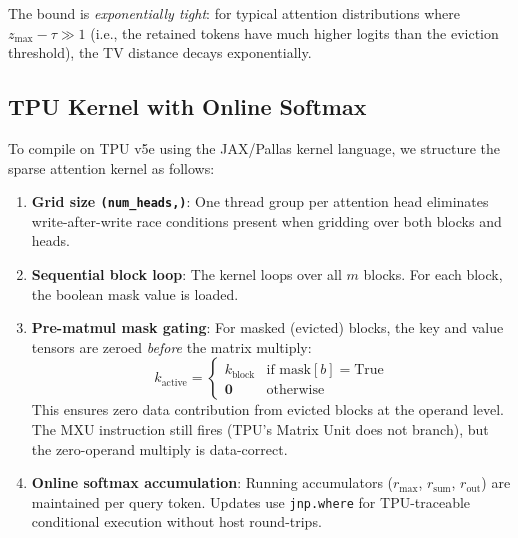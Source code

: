 \documentclass[conference,10pt]{IEEEtran}
\begin{document}
The bound is \emph{exponentially tight}: for typical attention distributions
where $z_{\max} - \tau \gg 1$ (i.e., the retained tokens have much higher
logits than the eviction threshold), the TV distance decays exponentially.

\subsection{TPU Kernel with Online Softmax}\label{sec:kernel}

To compile on TPU v5e using the JAX/Pallas kernel language, we structure the
sparse attention kernel as follows:

\begin{enumerate}
    \item \textbf{Grid size \texttt{(num\_heads,)}}: One thread group per
          attention head eliminates write-after-write race conditions present
          when gridding over both blocks and heads.
    \item \textbf{Sequential block loop}: The kernel loops over all $m$ blocks.
          For each block, the boolean mask value is loaded.
    \item \textbf{Pre-matmul mask gating}: For masked (evicted) blocks, the
          key and value tensors are zeroed \emph{before} the matrix multiply:
          \begin{equation}
              k_{\text{active}} = \begin{cases}
                  k_{\text{block}} & \text{if } \text{mask}[b] = \text{True} \\
                  \mathbf{0}       & \text{otherwise}
              \end{cases}
          \end{equation}
          This ensures zero data contribution from evicted blocks at the operand
          level. The MXU instruction still fires (TPU's Matrix Unit does not
          branch), but the zero-operand multiply is data-correct.
    \item \textbf{Online softmax accumulation}: Running accumulators
          ($r_{\max}$, $r_{\text{sum}}$, $r_{\text{out}}$) are maintained per
          query token. Updates use \texttt{jnp.where} for TPU-traceable
          conditional execution without host round-trips.
\end{enumerate}
\end{document}
